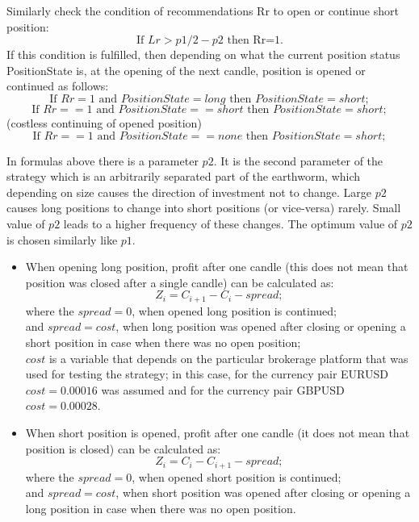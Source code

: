 \documentclass[runningheads,a4paper]{llncs}
\begin{document}
Similarly check the condition of recommendations Rr to open or continue short position:
\begin{equation}
\text{If } Lr>p1/2 - p2 \text { then Rr=1.}
\end{equation}
If this condition is fulfilled, then depending on what the current position status PositionState is, at the opening of the next candle, position is opened or continued as follows: \\
\begin{equation}
\text{If } Rr=1 \text{ and } PositionState =long \text{ then } PositionState =short;
\end{equation}
\begin{equation}
\text{If } Rr==1 \text{ and } PositionState ==short \text{ then } PositionState=short;
\end{equation}
(costless continuing of opened position)
\begin{equation}
\text{If } Rr==1 \text{ and }  PositionState ==none \text{ then }  PositionState =short;
\end{equation}

In formulas above there is a parameter $p2$. It is the second parameter of the strategy which is an arbitrarily separated part of the earthworm, which depending on size causes the direction of investment not to change. Large $p2$ causes long positions to change into short positions (or vice-versa) rarely. Small value of $p2$ leads to a higher frequency of these changes. The optimum value of $p2$ is chosen similarly like $p1$.
\begin{itemize}
\item 	When opening long position, profit after one candle (this does not mean that position was closed after a single candle) can be calculated as:
\begin{equation}
Z_i = C_{i+1} - C_i - spread;
\end{equation}
where the $spread = 0$, when opened long position is continued; \\
and $spread = cost$, when long position was opened after closing or opening a short position in case when there was no open position;\\
$cost$ is a variable that depends on the particular brokerage platform that was used for testing the strategy; in this case, for the currency pair EURUSD $cost = 0.00016$ was assumed and for the currency pair GBPUSD $cost = 0.00028$.
\item When short position is opened, profit after one candle (it does not mean that position is closed) can be calculated as: 
\begin{equation}
Z_i = C_i-C_{i+1}- spread;
\end{equation}
where the $spread = 0$, when opened short position is continued;\\ 
and $spread = cost$, when short position was opened after closing or opening a long position in case when there was no open position.
\end{itemize}
\end{document}
